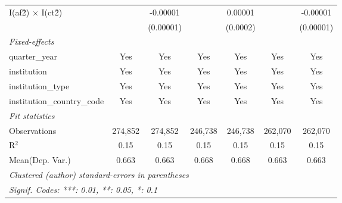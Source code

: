 \begin{tabular}{lcccccc}
   I(af\^2) $\times$ I(ct\^2)         &               & -0.00001        &               & 0.00001        &               & -0.00001\\   
                                      &               & (0.00001)       &               & (0.0002)       &               & (0.00001)\\   
   \midrule
   \emph{Fixed-effects}\\
   quarter\_year                      & Yes           & Yes             & Yes           & Yes            & Yes           & Yes\\  
   institution                        & Yes           & Yes             & Yes           & Yes            & Yes           & Yes\\  
   institution\_type                  & Yes           & Yes             & Yes           & Yes            & Yes           & Yes\\  
   institution\_country\_code         & Yes           & Yes             & Yes           & Yes            & Yes           & Yes\\  
   \midrule
   \emph{Fit statistics}\\
   Observations                       & 274,852       & 274,852         & 246,738       & 246,738        & 262,070       & 262,070\\  
   R$^2$                              & 0.15          & 0.15            & 0.15          & 0.15           & 0.15          & 0.15\\  
Mean(Dep. Var.) & 0.663 & 0.663 & 0.668 & 0.668 & 0.663 & 0.663 \\
   \midrule \midrule
   \multicolumn{7}{l}{\emph{Clustered (author) standard-errors in parentheses}}\\
   \multicolumn{7}{l}{\emph{Signif. Codes: ***: 0.01, **: 0.05, *: 0.1}}\\
\end{tabular}
\par\endgroup
